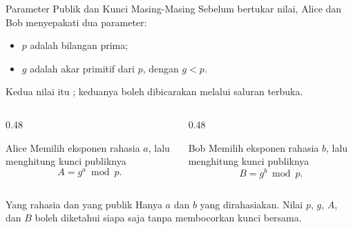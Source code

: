 \documentclass[aspectratio=169,11pt]{beamer}
\begin{document}
\begin{frame}{Parameter Publik dan Kunci Masing-Masing}
    \footnotesize
    Sebelum bertukar nilai, Alice dan Bob menyepakati dua parameter:
    \begin{itemize}
        \item $p$ adalah bilangan prima;
        \item $g$ adalah akar primitif dari $p$, dengan $g < p$.
    \end{itemize}
    Kedua nilai itu ; keduanya boleh dibicarakan
    melalui saluran terbuka.
    \vspace{0.15cm}
    \begin{columns}[T,onlytextwidth]
        \begin{column}{0.48\textwidth}
            \begin{block}{Alice}
                \footnotesize
                Memilih eksponen rahasia $a$, lalu menghitung kunci
                publiknya
                \[ A = g^{a} \bmod p . \]
            \end{block}
        \end{column}
        \begin{column}{0.48\textwidth}
            \begin{block}{Bob}
                \footnotesize
                Memilih eksponen rahasia $b$, lalu menghitung kunci
                publiknya
                \[ B = g^{b} \bmod p . \]
            \end{block}
        \end{column}
    \end{columns}
    \vspace{0.1cm}
    \begin{alertblock}{Yang rahasia dan yang publik}
        \footnotesize
        Hanya $a$ dan $b$ yang dirahasiakan. Nilai $p$, $g$, $A$, dan $B$
        boleh diketahui siapa saja tanpa membocorkan kunci bersama.
    \end{alertblock}
\end{frame}
\end{document}
